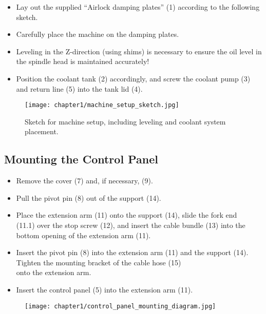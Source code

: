 \newpage

\begin{itemize}
    \item Lay out the supplied \enquote{Airlock damping plates} (1) according to the following sketch.
    \item Carefully place the machine on the damping plates.
    \item Leveling in the Z-direction (using shims) is necessary to ensure the oil level in the spindle head is maintained accurately!
    \item Position the coolant tank (2) accordingly, and screw the coolant pump (3) and return line (5) into the tank lid (4).
\end{itemize}

\vspace{1cm}

\begin{figure}[h!]
    \centering
    \texttt{[image: chapter1/machine\_setup\_sketch.jpg]}
    \caption{Sketch for machine setup, including leveling and coolant system placement.}
    \label{fig:machine_setup_sketch}
\end{figure}

\newpage
\subsection{Mounting the Control Panel}

\begin{itemize}
    \item Remove the cover (7) and, if necessary, (9).
    \item Pull the pivot pin (8) out of the support (14).
    \item Place the extension arm (11) onto the support (14), slide the fork end \\(11.1) over the stop screw (12), and insert the cable bundle (13) into the bottom opening of the extension arm (11).
    \item Insert the pivot pin (8) into the extension arm (11) and the support (14). Tighten the mounting bracket of the cable hose (15) \\onto the extension arm.
    \item Insert the control panel (5) into the extension arm (11).
\end{itemize}

\begin{figure}[h!]
    \centering
    \texttt{[image: chapter1/control\_panel\_mounting\_diagram.jpg]}
    \caption{}
    \label{fig:control_panel_mounting}
\end{figure}

